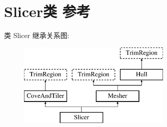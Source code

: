 \hypertarget{class_slicer}{}\section{Slicer类 参考}
\label{class_slicer}
类 Slicer 继承关系图\+:\begin{figure}[H]
\begin{center}
\leavevmode
\includegraphics[height=4.000000cm]{class_slicer}
\end{center}
\end{figure}
